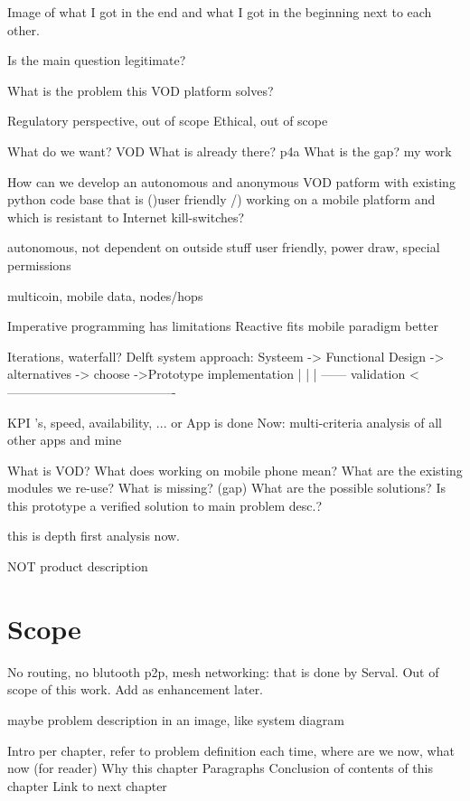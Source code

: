 Image of what I got in the end and what I got in the beginning next to each other.


Is the main question legitimate?


What is the problem this VOD platform solves?


Regulatory perspective, out of scope
Ethical, out of scope


What do we want? VOD
What is already there? p4a
What is the gap? my work

How can we develop an autonomous and anonymous VOD patform with existing python code base that is ()user friendly /) working on a mobile platform and which is resistant to Internet kill-switches?

autonomous, not dependent on outside stuff
user friendly, power draw, special permissions

multicoin, mobile data, nodes/hops



Imperative programming has limitations
Reactive fits mobile paradigm better


Iterations, waterfall?
Delft system approach:
Systeem -> Functional Design -> alternatives -> choose ->Prototype implementation
																									 |
|																									|
------			 validation				 <----------------------------------------

KPI 's, speed, availability, ...
or
App is done
Now: multi-criteria analysis of all other apps and mine



What is VOD?
What does working on mobile phone mean?
What are the existing modules we re-use?
What is missing? (gap)
What are the possible solutions?
Is this prototype a verified solution to main problem desc.?


this is depth first analysis now.

NOT product description

\section{Scope}
No routing, no blutooth p2p, mesh networking: that is done by Serval. Out of scope of this work. Add as enhancement later.



maybe problem description in an image, like system diagram



Intro per chapter, refer to problem definition each time, where are we now, what now (for reader)
Why this chapter
Paragraphs
Conclusion of contents of this chapter
Link to next chapter


